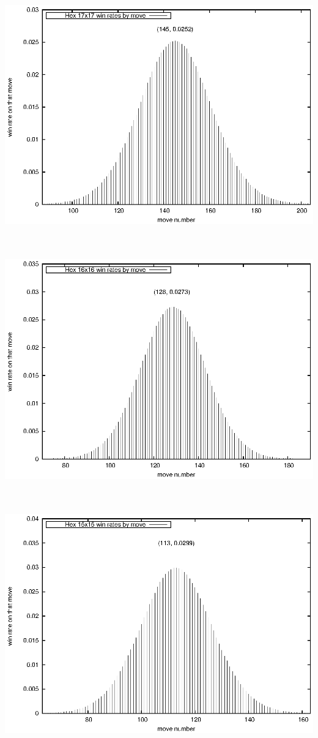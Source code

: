 \documentclass[12pt]{article}
\begin{document}
\ \hfill \includegraphics{code/data/gn/winrate.17.eps} \hfill \ 

\ \hfill \includegraphics{code/data/gn/winrate.16.eps} \hfill \ 

\ \hfill \includegraphics{code/data/gn/winrate.15.eps} \hfill \ 
\end{document}
